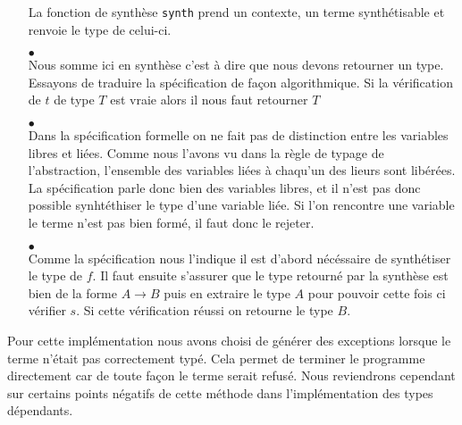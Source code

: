 \documentclass {article}
\newcommand{\codefrom}[3]
           {}
\theoremstyle{definition}
\theoremstyle{remark}
\begin{document}
\begin{itemize}
La fonction de synthèse \lstinline!synth! prend un contexte, un
terme synthétisable et renvoie le type de celui-ci.

 \codefrom{typed}{lambda}{synth_def}

\item[$\bullet$]  \\

  Nous somme ici en synthèse c'est à dire que nous devons retourner un type.
  Essayons de traduire la spécification de façon algorithmique. Si la vérification
  de $t$ de type $T$ est vraie alors il nous faut retourner $T$
  
\codefrom{typed}{lambda}{synth_ann}



\item[$\bullet$] \\

Dans la spécification formelle on ne fait pas de distinction entre les variables libres et liées.
Comme nous l'avons vu dans la règle de typage de l'abstraction, l'ensemble des variables
liées à chaqu'un des lieurs sont libérées. La spécification parle donc bien des variables libres,
et il n'est pas donc possible synhtéthiser le type d'une variable liée. Si l'on rencontre une variable
le terme n'est pas bien formé, il faut donc le rejeter.

\codefrom{typed}{lambda}{synth_var}

\item[$\bullet$] \\

  
  Comme la spécification nous l'indique il est d'abord nécéssaire de synthétiser le type de $f$.
  Il faut ensuite s'assurer que le type retourné par la synthèse est bien de la forme $A\rightarrow B$
  puis en extraire le type $A$ pour pouvoir cette fois ci vérifier $s$. Si cette vérification réussi
  on retourne le type $B$.
 
\codefrom{typed}{lambda}{synth_appl}

\end{itemize}

Pour cette implémentation nous avons choisi de générer des exceptions lorsque le terme
n'était pas correctement typé. Cela permet de terminer le programme directement car de toute
façon le terme serait refusé. Nous reviendrons cependant sur certains points négatifs de cette
méthode dans l'implémentation des types dépendants.
\end{document}

